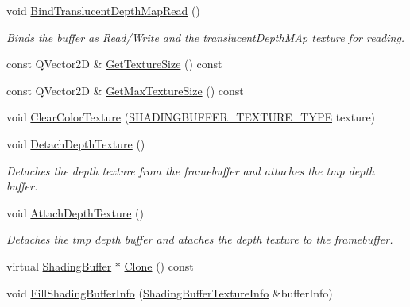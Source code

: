 \begin{DoxyCompactItemize}
void \mbox{\hyperlink{class_geometry_engine_1_1_geometry_buffer_1_1_shading_buffer_a9ee3f5301379da20df2a2550c44c9576}{Bind\+Translucent\+Depth\+Map\+Read}} ()
\begin{DoxyCompactList}\small\item\em Binds the buffer as Read/\+Write and the translucent\+Depth\+M\+Ap texture for reading. \end{DoxyCompactList}\item 
const Q\+Vector2D \& \mbox{\hyperlink{class_geometry_engine_1_1_geometry_buffer_1_1_shading_buffer_aae6f448abdadd4ef47b7b19984fc3831}{Get\+Texture\+Size}} () const
\item 
const Q\+Vector2D \& \mbox{\hyperlink{class_geometry_engine_1_1_geometry_buffer_1_1_shading_buffer_a6b45a6a2cc97775c11b6c6ff72bbc2b6}{Get\+Max\+Texture\+Size}} () const
\item 
void \mbox{\hyperlink{class_geometry_engine_1_1_geometry_buffer_1_1_shading_buffer_aea07ae2845342993bc8949f7e52a4c90}{Clear\+Color\+Texture}} (\mbox{\hyperlink{class_geometry_engine_1_1_geometry_buffer_1_1_shading_buffer_a8047a079ff9fb9fa3400651664c92ae9}{S\+H\+A\+D\+I\+N\+G\+B\+U\+F\+F\+E\+R\+\_\+\+T\+E\+X\+T\+U\+R\+E\+\_\+\+T\+Y\+PE}} texture)
\item 
\mbox{\label{class_geometry_engine_1_1_geometry_buffer_1_1_shading_buffer_af1ad5bf164f69282807959bbeaf2e975}} 
void \mbox{\hyperlink{class_geometry_engine_1_1_geometry_buffer_1_1_shading_buffer_af1ad5bf164f69282807959bbeaf2e975}{Detach\+Depth\+Texture}} ()
\begin{DoxyCompactList}\small\item\em Detaches the depth texture from the framebuffer and attaches the tmp depth buffer. \end{DoxyCompactList}\item 
\mbox{\label{class_geometry_engine_1_1_geometry_buffer_1_1_shading_buffer_ae9d73208781745650fe461168ca8870c}} 
void \mbox{\hyperlink{class_geometry_engine_1_1_geometry_buffer_1_1_shading_buffer_ae9d73208781745650fe461168ca8870c}{Attach\+Depth\+Texture}} ()
\begin{DoxyCompactList}\small\item\em Detaches the tmp depth buffer and ataches the depth texture to the framebuffer. \end{DoxyCompactList}\item 
virtual \mbox{\hyperlink{class_geometry_engine_1_1_geometry_buffer_1_1_shading_buffer}{Shading\+Buffer}} $\ast$ \mbox{\hyperlink{class_geometry_engine_1_1_geometry_buffer_1_1_shading_buffer_a608f7a6fbde69056a268fac83caecfab}{Clone}} () const
\item 
void \mbox{\hyperlink{class_geometry_engine_1_1_geometry_buffer_1_1_shading_buffer_a572f4e882695cc97ec4cba7946093d52}{Fill\+Shading\+Buffer\+Info}} (\mbox{\hyperlink{class_geometry_engine_1_1_shading_buffer_texture_info}{Shading\+Buffer\+Texture\+Info}} \&buffer\+Info)
\end{DoxyCompactItemize}
